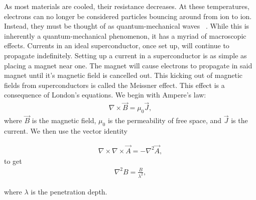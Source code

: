 As most materials are cooled, their resistance decreases. At these temperatures, electrons can no longer be considered particles bouncing around from ion to ion. Instead, they must be thought of as quantum-mechanical waves ~\cite{Miszczak15}. While this is inherently a quantum-mechanical phenomenon, it has a myriad of macroscopic effects. Currents in an ideal superconductor, once set up, will continue to propagate indefinitely. Setting up a current in a superconductor is as simple as placing a magnet near one. The magnet will cause electrons to propagate in said magnet until it's magnetic field is cancelled out. This kicking out of magnetic fields from superconductors is called the Meissner effect. This effect is a consequence of London's equations. We begin with Ampere's law:
\begin{eqnarray}
\nabla \times \overrightarrow B  = \mu_0 \overrightarrow J,
\label{Ampere}
\end{eqnarray}
where $\overrightarrow B$ is the magnetic field, $\mu_0$ is the permeability of free space, and $\overrightarrow J$ is the current. We then use the vector identity 

\begin{eqnarray}
\nabla \times \nabla \times \overrightarrow A  = -\nabla^2 \overrightarrow A,
\label{stokes}
\end{eqnarray}
to get 
\begin{eqnarray}
\nabla^2 B = \frac{B}{\lambda^2},
\label{penetration}
\end{eqnarray}

where $\lambda$ is the penetration depth. 

